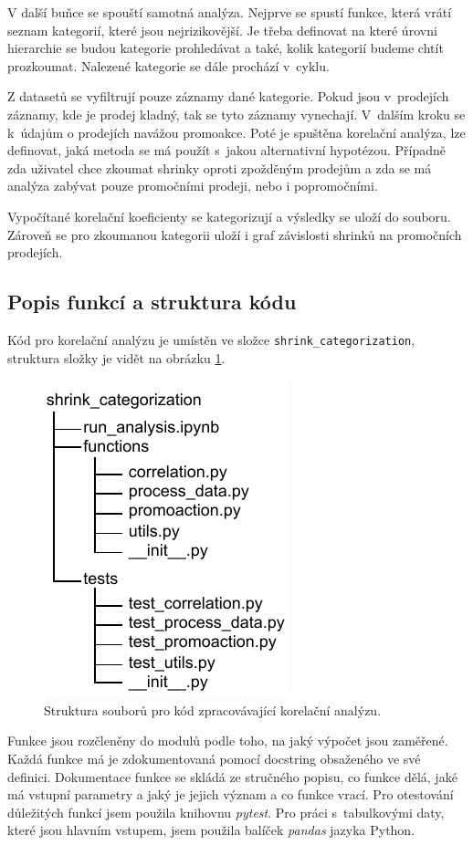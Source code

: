 V další buňce se spouští samotná analýza. Nejprve se spustí funkce, která vrátí seznam kategorií, které jsou nejrizikovější. Je třeba definovat na které úrovni hierarchie se budou kategorie prohledávat a také, kolik kategorií budeme chtít prozkoumat.
Nalezené kategorie se dále prochází v~cyklu.

Z datasetů se vyfiltrují pouze záznamy dané kategorie. Pokud jsou v~prodejích záznamy, kde je prodej kladný, tak se tyto záznamy vynechají. V~dalším kroku se k~údajům o prodejích navážou promoakce. Poté je spuštěna korelační analýza, lze definovat, jaká metoda se má použít s~jakou alternativní hypotézou. Případně zda uživatel chce zkoumat shrinky oproti zpožděným prodejům a zda se má analýza zabývat pouze promočními prodeji, nebo i popromočními.

Vypočítané korelační koeficienty se kategorizují a výsledky se uloží do souboru. Zároveň se pro zkoumanou kategorii uloží i graf závislosti shrinků na promočních prodejích.


\subsection{Popis funkcí a struktura kódu}

Kód pro korelační analýzu je umístěn ve složce \texttt{shrink\_categorization}, struktura složky je vidět na obrázku \ref*{obr:strukturaslozky}.

\begin{figure}[hbtp!]
    \captionsetup{justification=centering}
    \includegraphics[width=.3\textwidth]{obrazky/struktura_slozky.pdf}
    \caption{Struktura souborů pro kód zpracovávající korelační analýzu.}
    \label{obr:strukturaslozky}
\end{figure}

Funkce jsou rozčleněny do modulů podle toho, na jaký výpočet jsou zaměřené. Každá funkce má je zdokumentovaná pomocí docstring obsaženého ve své definici. Dokumentace funkce se skládá ze stručného popisu, co funkce dělá, jaké má vstupní parametry a jaký je jejich význam a co funkce vrací. 
Pro otestování důležitých funkcí jsem použila knihovnu \emph{pytest}. 
Pro práci s~tabulkovými daty, které jsou hlavním vstupem, jsem použila balíček \emph{pandas} jazyka Python. 


